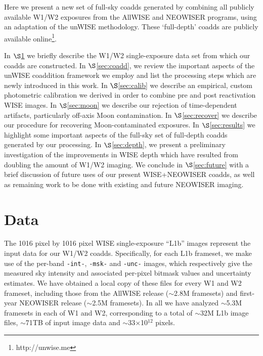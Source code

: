 \documentclass{emulateapj}
\begin{document}

Here we present a new set of full-sky coadds generated by
combining all publicly available W1/W2 exposures from the AllWISE and NEOWISER
programs, using an adaptation of the \cite{lang14} unWISE methodology. These 
`full-depth' coadds are publicly available online\footnote{http://unwise.me}.

In $\S$\ref{sec:data} we briefly describe the W1/W2 single-exposure data set 
from which our coadds are constructed. In $\S$\ref{sec:coadd}, we review the 
important aspects of the unWISE coaddition framework we employ and list the 
processing steps which are newly introduced in this work. In 
$\S$\ref{sec:calib} we describe an empirical, custom photometric calibration we
derived in order to combine pre and post reactivation WISE images. In 
$\S$\ref{sec:moon} we describe our rejection of time-dependent artifacts, 
particularly off-axis Moon contamination. In $\S$\ref{sec:recover} we describe
our procedure for recovering Moon-contaminated exposures. In 
$\S$\ref{sec:results} we highlight some important aspects of the full-sky set 
of full-depth coadds generated by our processing. In $\S$\ref{sec:depth}, we 
present a preliminary investigation of the improvements in WISE depth which 
have resulted from doubling the amount of W1/W2 imaging. We conclude in 
$\S$\ref{sec:future} with a brief discussion of future uses of our present 
WISE+NEOWISER coadds, as well as remaining work to be done with existing and 
future NEOWISER imaging.

\section{Data}
\label{sec:data}

The 1016 pixel by 1016 pixel WISE single-exposure ``L1b'' images represent
the input data for our W1/W2 coadds. Specifically, for each L1b frameset, we 
make use of the per-band \verb|-int-|, \verb|-msk-| and \verb|-unc-| images, 
which respectively give the measured sky intensity and associated per-pixel 
bitmask values and uncertainty estimates. We have obtained a local copy of 
these files for every W1 and W2 frameset, including those from the AllWISE 
release ($\sim$2.8M framesets) and first-year NEOWISER release ($\sim$2.5M 
framesets). In all we have analyzed $\sim$5.3M framesets in each of W1 and 
W2, corresponding to a total of $\sim$32M L1b image files, $\sim$71TB of 
input image data and $\sim$33$\times$10$^{12}$ pixels.
\end{document}
